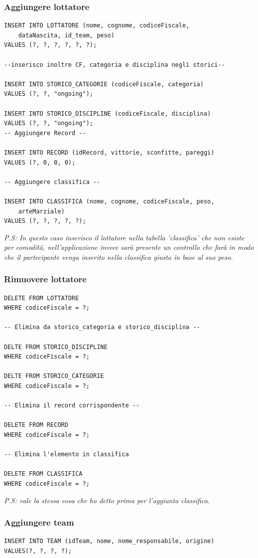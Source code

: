 \documentclass[a4paper,12pt]{report}
\begin{document}
\subsubsection{Aggiungere lottatore}
\begin{verbatim}
INSERT INTO LOTTATORE (nome, cognome, codiceFiscale, 
    dataNascita, id_team, peso)
VALUES (?, ?, ?, ?, ?, ?);

--inserisco inoltre CF, categoria e disciplina negli storici--

INSERT INTO STORICO_CATEGORIE (codiceFiscale, categoria)
VALUES (?, ?, "ongoing");

INSERT INTO STORICO_DISCIPLINE (codiceFiscale, disciplina)
VALUES (?, ?, "ongoing");
-- Aggiungere Record --

INSERT INTO RECORD (idRecord, vittorie, sconfitte, pareggi)
VALUES (?, 0, 0, 0);

-- Aggiungere classifica --

INSERT INTO CLASSIFICA (nome, cognome, codiceFiscale, peso, 
    arteMarziale)
VALUES (?, ?, ?, ?, ?);

\end{verbatim}
\textsl{P.S: In questo caso inserisco il lottatore nella tabella 'classifica' che non esiste per comodità, 
nell'applicazione invece sarà presente un controllo che farà in modo che il partecipante venga 
inserito nella classifica giusta in base al suo peso.}

\subsubsection{Rimuovere lottatore}
\begin{verbatim}
DELETE FROM LOTTATORE
WHERE codiceFiscale = ?;

-- Elimina da storico_categoria e storico_disciplina --

DELTE FROM STORICO_DISCIPLINE
WHERE codiceFiscale = ?;

DELTE FROM STORICO_CATEGORIE
WHERE codiceFiscale = ?;

-- Elimina il record corrispondente --

DELETE FROM RECORD
WHERE codiceFiscale = ?;

-- Elimina l'elemento in classifica

DELETE FROM CLASSIFICA
WHERE codiceFiscale = ?;
\end{verbatim}
\textsl{P.S: vale la stessa cosa che ho detto prima per l'aggiunta classifica.}
\subsubsection{Aggiungere team}
\begin{verbatim}
INSERT INTO TEAM (idTeam, nome, nome_responsabile, origine)
VALUES(?, ?, ?, ?);
\end{verbatim}
\end{document}
